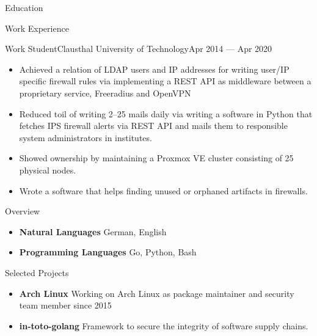 \documentclass[]{mcdowellcv}
\begin{document}
\begin{cvsection}{Education}
\begin{cvsection}{Work Experience}
\begin{cvsubsection}{Work Student}{Clausthal University of Technology}{Apr 2014 --- Apr 2020}
\begin{itemize}
\item Achieved a relation of LDAP users and IP addresses for writing user/IP specific firewall rules via implementing
a REST API as middleware between a proprietary service, Freeradius and OpenVPN
\item Reduced toil of writing 2--25 mails daily via writing a software in Python that fetches IPS firewall alerts via REST API and mails them
to responsible system administrators in institutes.
\item Showed ownership by maintaining a Proxmox VE cluster consisting of 25 physical nodes.
\item Wrote a software that helps finding unused or orphaned artifacts in firewalls.
\end{itemize}
\end{cvsubsection}
\end{cvsection}

\begin{cvsection}{Overview}
\begin{cvsubsection}{}{}{}
\begin{itemize}
\item \textbf{Natural Languages} German, English
\item \textbf{Programming Languages} Go, Python, Bash
\end{itemize}
\end{cvsubsection}
\end{cvsection}

\end{cvsection}
\begin{cvsection}{Selected Projects}
\begin{cvsubsection}{}{}{}
\begin{itemize}
\item \textbf{Arch Linux} Working on Arch Linux as package maintainer and security team member since 2015
\item \textbf{in-toto-golang} Framework to secure the integrity of software supply chains.
\end{itemize}
\end{cvsubsection}
\end{cvsection}
\end{document}
